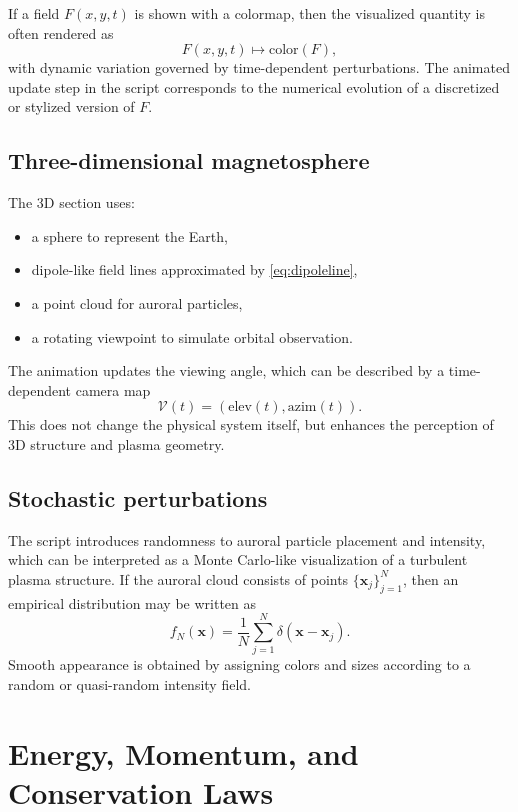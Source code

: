 \documentclass[11pt]{article}
\begin{document}
If a field \(F(x,y,t)\) is shown with a colormap, then the visualized quantity is often rendered as
\begin{equation}
F(x,y,t) \mapsto \text{color}(F),
\end{equation}
with dynamic variation governed by time-dependent perturbations. The animated update step in the script corresponds to the numerical evolution of a discretized or stylized version of \(F\).

\subsection{Three-dimensional magnetosphere}
The 3D section uses:
\begin{itemize}
    \item a sphere to represent the Earth,
    \item dipole-like field lines approximated by \eqref{eq:dipoleline},
    \item a point cloud for auroral particles,
    \item a rotating viewpoint to simulate orbital observation.
\end{itemize}

The animation updates the viewing angle, which can be described by a time-dependent camera map
\begin{equation}
\mathcal{V}(t) = (\text{elev}(t), \text{azim}(t)).
\end{equation}
This does not change the physical system itself, but enhances the perception of 3D structure and plasma geometry.

\subsection{Stochastic perturbations}
The script introduces randomness to auroral particle placement and intensity, which can be interpreted as a Monte Carlo-like visualization of a turbulent plasma structure. If the auroral cloud consists of points \(\{\bm{x}_j\}_{j=1}^N\), then an empirical distribution may be written as
\begin{equation}
f_N(\bm{x}) = \frac{1}{N}\sum_{j=1}^N \delta(\bm{x} - \bm{x}_j).
\end{equation}
Smooth appearance is obtained by assigning colors and sizes according to a random or quasi-random intensity field.

\section{Energy, Momentum, and Conservation Laws}
\end{document}
